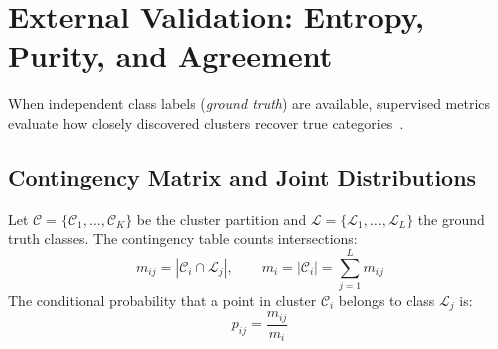 \section{External Validation: Entropy, Purity, and Agreement}
\label{sec:dm-external-measures}

When independent class labels (\textit{ground truth}) are available, supervised metrics evaluate how closely discovered clusters recover true categories~\cite{tan2018}.

\subsection{Contingency Matrix and Joint Distributions}
Let $\mathcal{C} = \{\mathcal{C}_1, \dots, \mathcal{C}_K\}$ be the cluster partition and $\mathcal{L} = \{\mathcal{L}_1, \dots, \mathcal{L}_L\}$ the ground truth classes.
The contingency table counts intersections:
\begin{equation}
\label{eq:dm-contingency-cell-en}
m_{ij} = |\mathcal{C}_i \cap \mathcal{L}_j|, \qquad m_i = |\mathcal{C}_i| = \sum_{j=1}^L m_{ij}
\end{equation}
The conditional probability that a point in cluster $\mathcal{C}_i$ belongs to class $\mathcal{L}_j$ is:
\begin{equation}
p_{ij} = \frac{m_{ij}}{m_i}
\end{equation}

